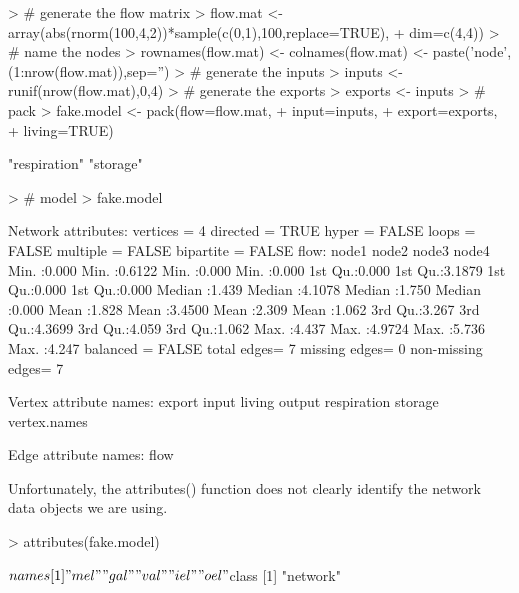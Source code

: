 \documentclass[11pt]{article}
\begin{document}
\begin{Schunk}
\begin{Sinput}
> # generate the flow matrix
> flow.mat <- array(abs(rnorm(100,4,2))*sample(c(0,1),100,replace=TRUE),
+                    dim=c(4,4))
> # name the nodes
> rownames(flow.mat) <- colnames(flow.mat) <- paste('node',(1:nrow(flow.mat)),sep='')
> # generate the inputs
> inputs <- runif(nrow(flow.mat),0,4)
> # generate the exports
> exports <- inputs
> # pack
> fake.model <- pack(flow=flow.mat,
+                     input=inputs,
+                     export=exports,
+                     living=TRUE)
\end{Sinput}
\begin{Soutput}
[1] "respiration" "storage"    
\end{Soutput}
\begin{Sinput}
> # model
> fake.model
\end{Sinput}
\begin{Soutput}
 Network attributes:
  vertices = 4 
  directed = TRUE 
  hyper = FALSE 
  loops = FALSE 
  multiple = FALSE 
  bipartite = FALSE 
  flow:
     node1           node2            node3           node4      
 Min.   :0.000   Min.   :0.6122   Min.   :0.000   Min.   :0.000  
 1st Qu.:0.000   1st Qu.:3.1879   1st Qu.:0.000   1st Qu.:0.000  
 Median :1.439   Median :4.1078   Median :1.750   Median :0.000  
 Mean   :1.828   Mean   :3.4500   Mean   :2.309   Mean   :1.062  
 3rd Qu.:3.267   3rd Qu.:4.3699   3rd Qu.:4.059   3rd Qu.:1.062  
 Max.   :4.437   Max.   :4.9724   Max.   :5.736   Max.   :4.247  
  balanced = FALSE 
  total edges= 7 
    missing edges= 0 
    non-missing edges= 7 

 Vertex attribute names: 
    export input living output respiration storage vertex.names 

 Edge attribute names: 
    flow 
\end{Soutput}
\end{Schunk}

Unfortunately, the attributes() function does not clearly identify the
network data objects we are using.

\begin{Schunk}
\begin{Sinput}
> attributes(fake.model)
\end{Sinput}
\begin{Soutput}
$names
[1] "mel" "gal" "val" "iel" "oel"

$class
[1] "network"
\end{Soutput}
\end{Schunk}
\end{document}
